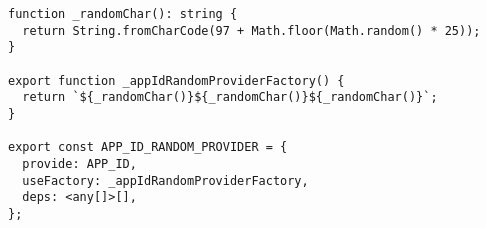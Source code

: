 \begin{verbatim}
function _randomChar(): string {
  return String.fromCharCode(97 + Math.floor(Math.random() * 25));
}

export function _appIdRandomProviderFactory() {
  return `${_randomChar()}${_randomChar()}${_randomChar()}`;
}

export const APP_ID_RANDOM_PROVIDER = {
  provide: APP_ID,
  useFactory: _appIdRandomProviderFactory,
  deps: <any[]>[],
};
\end{verbatim}
